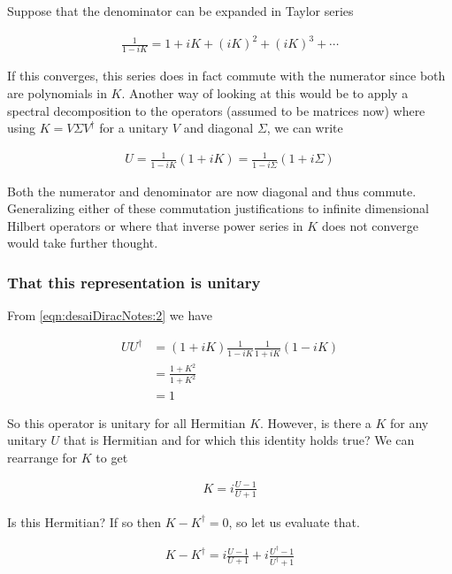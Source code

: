 Suppose that the denominator can be expanded in Taylor series

\begin{align*}
\frac{1}{1-iK} = 1 + iK + (iK)^2 + (iK)^3 + \cdots
\end{align*}

If this converges, this series does in fact commute with the numerator since both are polynomials in $K$.  Another way of looking at this would be to apply a spectral decomposition to the operators (assumed to be matrices now) where using $K = V \Sigma V^\dagger$ for a unitary $V$ and diagonal $\Sigma$, we can write

\begin{align*}
U = \frac{1}{1-iK}(1 + iK) = \frac{1}{1-i \Sigma}(1 + i \Sigma)
\end{align*}

Both the numerator and denominator are now diagonal and thus commute.  Generalizing either of these commutation justifications to infinite dimensional Hilbert operators or where that inverse power series in $K$ does not converge would take further thought.

\subsubsection{That this representation is unitary}

From \ref{eqn:desaiDiracNotes:2} we have

\begin{align*}
U U^\dagger 
&= (1 + iK)\frac{1}{1-iK} \frac{1}{1+iK} (1 - iK) \\
&= \frac{1 + K^2}{1+K^2} \\
&= 1
\end{align*}

So this operator is unitary for all Hermitian $K$.  However, is there a $K$ for any unitary $U$ that is Hermitian and for which this identity holds true?  We can rearrange for $K$ to get

\begin{align}\label{eqn:desaiDiracNotes:3}
K = i \frac{ U - 1 }{U + 1}
\end{align}

Is this Hermitian?  If so then $K - K^\dagger = 0$, so let us evaluate that.

\begin{align*}
K - K^\dagger = i \frac{ U - 1 }{U + 1} + i \frac{ U^\dagger - 1 }{U^\dagger + 1}
\end{align*}


